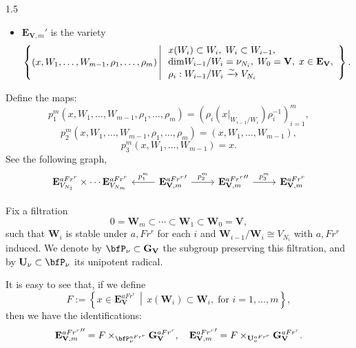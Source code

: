 \documentclass[10pt]{amsart}
\def\dim{\mbox{\rm dim}}   \def\End{\mbox{\rm End}}
\def\bfV{{\mathbf V}}
\def\bfV{\mathbf{V}}
\def\bfW{\mathbf{W}}
\def\bfE{\mathbf{E}}
\def\bfG{\mathbf{G}}
\def\bfU{\mathbf{U}}
\begin{document}
\begin{spacing}{1.5}
\begin{itemize}
    \item $\bfE_{\bfV,m}'$ is the variety
    \[
    \left\{ (x, W_1, \dots, W_{m-1}, \rho_1, \dots, \rho_m) \,\middle|\,
    \begin{array}{l}
    x(W_i) \subset W_i, \; W_i \subset W_{i-1}, \\
    \dim W_{i-1}/W_i = \nu_{N_i}, \; W_0 = \bfV, \; x \in \bfE_{\bfV}, \\
    \rho_i : W_{i-1}/W_i \xrightarrow{\sim} V_{N_i}
    \end{array}
    \right\}.
    \]
\end{itemize}

Define the maps:
\[
p_1^m(x, W_1, \dots, W_{m-1}, \rho_1, \dots, \rho_m) = \left( \rho_i(x|_{W_{i-1}/W_i}) \rho_i^{-1} \right)_{i=1}^m,
\]
\[
p_2^m(x, W_1, \dots, W_{m-1}, \rho_1, \dots, \rho_m) = (x, W_1, \dots, W_{m-1}),
\]
\[
p_3^m(x, W_1, \dots, W_{m-1}) = x.
\]
See the following graph,
$$\begin{tikzcd}
\bfE_{V_{N_1}}^{a{Fr^r}}\times \cdots \bfE_{V_{N_m}}^{a{Fr}^r} & {{\bfE_{\bfV,m}^{a{Fr}^r}}^{\prime}} \arrow[l, "p_1^m"'] \arrow[r, "p_2^m"] & {{\bfE_{\bfV,m}^{a{Fr}^r}}^{\prime\prime}} \arrow[r, "p_3^m"] & {\bfE_{\bfV,m}^{a{Fr}^r}}
\end{tikzcd}$$

Fix a filtration
\[
0 = \bfW_m \subset \cdots \subset \bfW_1 \subset \bfW_0 = \bfV,
\]
such that $\bfW_i$ is stable under  $a,Fr^r$ for each $i$ and $\bfW_{i-1}/\bfW_i \cong V_{N_i}$ with $a,Fr^r$ induced. We denote by $\bfP_{\nu} \subset \bfG_{\bfV}$ the subgroup preserving this filtration, and by $\bfU_{\nu} \subset \bfP_{\nu}$ its unipotent radical.

It is easy to see that, if we define
\[
F := \left\{ x \in \bfE_{\bfV}^{aFr^r} \,\middle|\, x(\bfW_i) \subset \bfW_i,\; \text{for } i = 1, \dots, m \right\},
\]
then we have the identifications:
\[
{\bfE_{\bfV,m}^{aFr^r}}^{\prime\prime} = F \times_{\bfP_{\nu}^{aFr^r}} \bfG_{\bfV}^{aFr^r}, \quad
{\bfE_{\bfV,m}^{aFr^r}}^{\prime} = F \times_{\bfU_{\nu}^{aFr^r}} \bfG_{\bfV}^{aFr^r}.
\]


\end{spacing}
\end{document}
